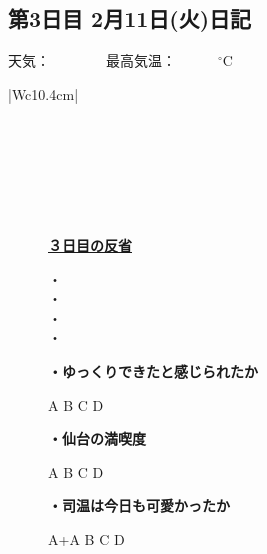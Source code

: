 \newpage

\subsection*{第3日目 2月11日(火)日記}
\vspace{0.5cm}
\centering
{}
\vspace{0.25cm}

\begin{rightline}
	{\scriptsize{天気：　　　　最高気温：　　　$ {}^\circ $C}}
\end{rightline}
\begin{table}[H]
	\centering
	\begin{tabular}{|Wc{10.4cm}|} \hline
		\\ \hline
		\\ \hline
		\\ \hline
		\\ \hline
		\\ \hline
		\\ \hline
		\\ \hline
	\end{tabular}
\end{table}

\begin{figure}[H]
	\begin{minipage}[b]{0.45\hsize}
		\begin{boxnote}
			\vspace{-0.2cm}
			\begin{center}
				\underline{\footnotesize{\textbf{３日目の反省}}}
			\end{center}
			\vspace{-0.4cm}
			
			\fontsize{12pt}{25pt}\selectfont
			・\\
			・\\
			・\\
			・
		\end{boxnote}
	\end{minipage}
	\hfill
	\begin{minipage}[b]{0.45\hsize}
		\begin{screen}
			\vspace{0.5cm}
			\scriptsize{\textbf{・ゆっくりできたと感じられたか}}
			\begin{center}
				A \quad B \quad C \quad D
			\end{center}
			\scriptsize{\textbf{・仙台の満喫度}}
			\begin{center}
				A \quad B \quad C \quad D
			\end{center}
			\scriptsize{\textbf{・司温は今日も可愛かったか}}
			\begin{center}
				A+\quad	A \quad B \quad C \quad D
			\end{center}
			\vspace{0.05cm}
		\end{screen}
	\end{minipage}
\end{figure}